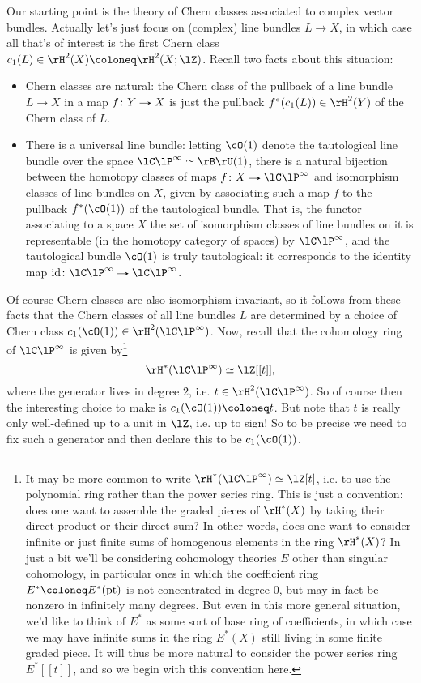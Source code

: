 Our starting point is the theory of Chern classes associated to
complex vector bundles. Actually let's just focus on (complex) line
bundles $L \to X$, in which case all that's of interest is the first
Chern class $c_1(L) \in \rH^2(X) \ce \rH^2(X;\lZ)$. Recall two facts
about this situation:
\begin{itemize}
\item Chern classes are natural: the Chern class of the pullback of a
  line bundle $L \to X$ in a map $f \c Y \to X$ is just the pullback
  $f^*(c_1(L)) \in \rH^2(Y)$ of the Chern class of $L$.
\item There is a universal line bundle: letting $\cO(1)$ denote the
  tautological line bundle over the space $\CP^\infty \iso \rB\rU(1)$,
  there is a natural bijection between the homotopy classes of maps
  $f \c X \to \CP^\infty$ and isomorphism classes of line bundles on
  $X$, given by associating such a map $f$ to the pullback
  $f^*(\cO(1))$ of the tautological bundle. That is, the functor
  associating to a space $X$ the set of isomorphism classes of line
  bundles on it is representable (in the homotopy category of spaces)
  by $\CP^\infty$, and the tautological bundle $\cO(1)$ is truly
  tautological: it corresponds to the identity map
  $\id \c \CP^\infty \to \CP^\infty$.
\end{itemize}
Of course Chern classes are also isomorphism-invariant, so it follows
from these facts that the Chern classes of all line bundles $L$ are
determined by a choice of Chern class
$c_1(\cO(1)) \in \rH^2(\CP^\infty)$. Now, recall that the cohomology
ring of $\CP^\infty$ is given by\footnote{It may be more common to
  write $\rH^*(\CP^\infty) \iso \lZ[t]$, i.e. to use the polynomial
  ring rather than the power series ring. This is just a convention:
  does one want to assemble the graded pieces of $\rH^*(X)$ by taking
  their direct product or their direct sum? In other words, does one
  want to consider infinite or just finite sums of homogenous elements
  in the ring $\rH^*(X)$? In just a bit we'll be considering
  cohomology theories $E$ other than singular cohomology, in
  particular ones in which the coefficient ring $E^* \ce E^*(\pt)$ is
  not concentrated in degree $0$, but may in fact be nonzero in
  infinitely many degrees. But even in this more general situation,
  we'd like to think of $E^*$ as some sort of base ring of
  coefficients, in which case we may have infinite sums in the ring
  $E^*(X)$ still living in some finite graded piece. It will thus be
  more natural to consider the power series ring $E^*[[t]]$, and so we
  begin with this convention here.}
\[
\rH^*(\CP^\infty) \iso \lZ[[t]],
\]
where the generator lives in degree $2$, i.e.
$t \in \rH^2(\CP^\infty)$. So of course then the interesting choice to
make is $c_1(\cO(1)) \ce t$. But note that $t$ is really only
well-defined up to a unit in $\lZ$, i.e. up to sign! So to be precise
we need to fix such a generator and then declare this to be
$c_1(\cO(1))$.

